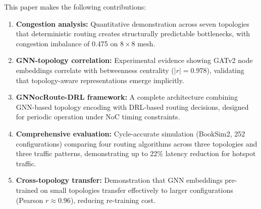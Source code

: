 This paper makes the following contributions:

\begin{enumerate}
    \item \textbf{Congestion analysis:} Quantitative demonstration across seven topologies that deterministic routing creates structurally predictable bottlenecks, with congestion imbalance of 0.475 on $8\times8$ mesh.
    
    \item \textbf{GNN-topology correlation:} Experimental evidence showing GATv2 node embeddings correlate with betweenness centrality ($|r| = 0.978$), validating that topology-aware representations emerge implicitly.
    
    \item \textbf{GNNocRoute-DRL framework:} A complete architecture combining GNN-based topology encoding with DRL-based routing decisions, designed for periodic operation under NoC timing constraints.
    
    \item \textbf{Comprehensive evaluation:} Cycle-accurate simulation (BookSim2, 252 configurations) comparing four routing algorithms across three topologies and three traffic patterns, demonstrating up to 22\% latency reduction for hotspot traffic.
    
    \item \textbf{Cross-topology transfer:} Demonstration that GNN embeddings pre-trained on small topologies transfer effectively to larger configurations (Pearson $r \approx 0.96$), reducing re-training cost.
\end{enumerate}
